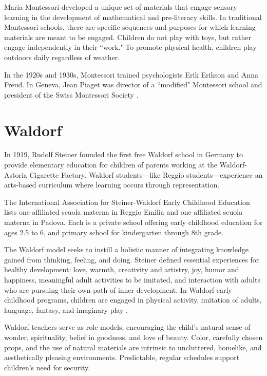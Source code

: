 \documentclass{article}
\theoremstyle{definition}
\theoremstyle{remark}
\begin{document}
Maria Montessori developed a unique set of materials that engage sensory learning in the development of mathematical and pre-literacy skills. In traditional Montessori schools, there are specific sequences and purposes for which learning materials are meant to be engaged. Children do not play with toys, but rather engage independently in their ``work." To promote physical health, children play outdoors daily regardless of weather. 

In the 1920s and 1930s, Montessori trained psychologists Erik Erikson and Anna Freud. In Geneva, Jean Piaget was director of a ``modified" Montessori school and president of the Swiss Montessori Society \citep{Haines2000}. 

\section{Waldorf}

In 1919, Rudolf Steiner founded the first free Waldorf school in Germany to provide elementary education for children of parents working at the Waldorf-Astoria Cigarette Factory. Waldorf students---like Reggio students---experience an arts-based curriculum where learning occurs through representation.  

The International Association for Steiner-Waldorf Early Childhood Education lists one affiliated scuola materna in Reggio Emilia and one affiliated scuola materna in Padova. Each is a private school offering early childhood education for ages 2.5 to 6, and primary school for kindergarten through 8th grade. \citetext{\citeauthor{WaldorfPadova-website}}

The Waldorf model seeks to instill a holistic manner of integrating knowledge gained from thinking, feeling, and doing. Steiner defined essential experiences for healthy development: love, warmth, creativity and artistry, joy, humor and happiness, meaningful adult activities to be imitated, and interaction with adults who are pursuing their own path of inner development. In Waldorf early childhood programs, children are engaged in physical activity, imitation of adults, language, fantasy, and imaginary play \citep{Edwards_2002_ECRP}.

Waldorf teachers serve as role models, encouraging the child's natural sense of wonder, spirituality, belief in goodness, and love of beauty. Color, carefully chosen props, and the use of natural materials are intrinsic to uncluttered, homelike, and aesthetically pleasing environments. Predictable, regular schedules support children's need for security. 
\end{document}
